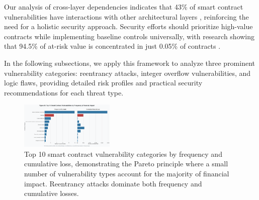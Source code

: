 Our analysis of cross-layer dependencies indicates that 43\% of smart contract vulnerabilities have interactions with other architectural layers \cite{praitheeshan2019systematic}, reinforcing the need for a holistic security approach. Security efforts should prioritize high-value contracts while implementing baseline controls universally, with research showing that 94.5\% of at-risk value is concentrated in just 0.05\% of contracts \cite{perez2021analysis}.

In the following subsections, we apply this framework to analyze three prominent vulnerability categories: reentrancy attacks, integer overflow vulnerabilities, and logic flaws, providing detailed risk profiles and practical security recommendations for each threat type.


\begin{figure}[H]
\centering
\includegraphics[width=0.4\textwidth]{../figure/Fig9.png}
\caption{Top 10 smart contract vulnerability categories by frequency and cumulative loss, demonstrating the Pareto principle where a small number of vulnerability types account for the majority of financial impact. Reentrancy attacks dominate both frequency and cumulative losses.}
\label{fig:smart_contract_pareto}
\end{figure}